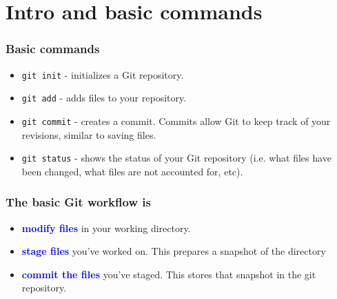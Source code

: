 %
%
\section{Intro and basic commands}

%
%
\begin{frame}[fragile]
  \frametitle{
    Basic commands
  }
  
  \begin{itemize}%
  \item
    {\tt git init} - initializes a Git repository.
  \item
    {\tt git add} - adds files to your repository.
  \item
    {\tt git commit} - creates a commit. Commits allow Git to keep track of your revisions, similar to saving files.
  \item
    {\tt git status} - shows the status of your Git repository (i.e. what files have been changed, what files are not accounted for, etc).
  \end{itemize}

\end{frame}

%
%
\begin{frame}
  \frametitle{
    The basic Git workflow is
  }

  \begin{itemize}%
  \item
    \textcolor{blue}{\bf modify files} in your working directory.
  \item
    \textcolor{blue}{\bf stage files} you've worked on. This prepares a snapshot of the directory
  \item
    \textcolor{blue}{\bf commit the files} you've staged. This stores that snapshot in the git repository.
  \end{itemize}

\end{frame}

